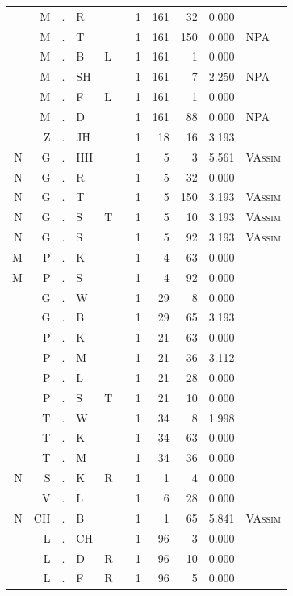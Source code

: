\documentclass[12pt]{article}
\begin{document}
\begin{longtable}{r@{ } r@{ } c@{ } l@{ } l@{ } l@{ } r r r r l }
 & M & . & R &  &  & 1 & 161 & 32 & 0.000 &  \\
 & M & . & T &  &  & 1 & 161 & 150 & 0.000 & \textsc{NPA} \\
 & M & . & B & L &  & 1 & 161 & 1 & 0.000 &  \\
 & M & . & SH &  &  & 1 & 161 & 7 & 2.250 & \textsc{NPA} \\
 & M & . & F & L &  & 1 & 161 & 1 & 0.000 &  \\
 & M & . & D &  &  & 1 & 161 & 88 & 0.000 & \textsc{NPA} \\
 & Z & . & JH &  &  & 1 & 18 & 16 & 3.193 &  \\
N & G & . & HH &  &  & 1 & 5 & 3 & 5.561 & \textsc{VAssim} \\
N & G & . & R &  &  & 1 & 5 & 32 & 0.000 &  \\
N & G & . & T &  &  & 1 & 5 & 150 & 3.193 & \textsc{VAssim} \\
N & G & . & S & T &  & 1 & 5 & 10 & 3.193 & \textsc{VAssim} \\
N & G & . & S &  &  & 1 & 5 & 92 & 3.193 & \textsc{VAssim} \\
M & P & . & K &  &  & 1 & 4 & 63 & 0.000 &  \\
M & P & . & S &  &  & 1 & 4 & 92 & 0.000 &  \\
 & G & . & W &  &  & 1 & 29 & 8 & 0.000 &  \\
 & G & . & B &  &  & 1 & 29 & 65 & 3.193 &  \\
 & P & . & K &  &  & 1 & 21 & 63 & 0.000 &  \\
 & P & . & M &  &  & 1 & 21 & 36 & 3.112 &  \\
 & P & . & L &  &  & 1 & 21 & 28 & 0.000 &  \\
 & P & . & S & T &  & 1 & 21 & 10 & 0.000 &  \\
 & T & . & W &  &  & 1 & 34 & 8 & 1.998 &  \\
 & T & . & K &  &  & 1 & 34 & 63 & 0.000 &  \\
 & T & . & M &  &  & 1 & 34 & 36 & 0.000 &  \\
N & S & . & K & R &  & 1 & 1 & 4 & 0.000 &  \\
 & V & . & L &  &  & 1 & 6 & 28 & 0.000 &  \\
N & CH & . & B &  &  & 1 & 1 & 65 & 5.841 & \textsc{VAssim} \\
 & L & . & CH &  &  & 1 & 96 & 3 & 0.000 &  \\
 & L & . & D & R &  & 1 & 96 & 10 & 0.000 &  \\
 & L & . & F & R &  & 1 & 96 & 5 & 0.000 &  \\

\end{longtable}
\end{document}
